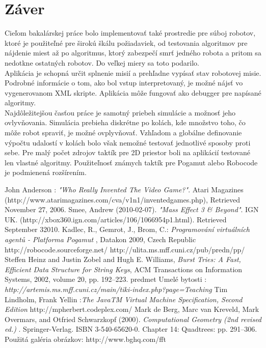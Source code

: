 \documentclass[12pt,notitlepage]{report}
\begin{document}
\chapter{Záver}
Cieľom bakalárskej práce bolo implementovať také prostredie pre súboj robotov, ktoré je použiteľné pre širokú škálu požiadaviek, od testovania algoritmov pre nájdenie miest až po algoritmus, ktorý zabezpečí smrť jedného robota a pritom sa nedotkne ostatných robotov. Do veľkej miery sa toto podarilo. \\
Aplikácia je schopná určit splnenie misií a prehľadne vypísať stav robotovej misie. Podrobné informácie o tom, ako bol vstup interpretovaný, je možné nájsť vo vygenerovanom XML skripte. Aplikácia môže fungovať ako debugger pre napísané algoritmy.\\
Najdôležitejšou časťou práce je samotný priebeh simulácie a možnosť jeho ovlyvňovania. Simulácia prebieha diskrétne po kolách, kde množstvo toho, čo môže robot spraviť, je možné ovplyvňovať. Vzhľadom a globálne definovanie výpočtu udalostí v kolách bolo však nemožné testovať jednotlivé sposoby proti sebe.  Pre malý počet zdrojov taktík pre 2D priestor boli na aplikácií testované len vlastné algoritmy. Použiteľnosť známych taktík pre Pogamut\cite{pogamut} alebo Robocode\cite{robocode} je podmienená rozšírením.\\

\newpage
{}
\begin{thebibliography}{99}
John Anderson : \emph{"Who Really Invented The Video Game?"}. Atari Magazines (http://www.atarimagazines.com/cva/v1n1/inventedgames.php),
Retrieved November 27, 2006.
Smee, Andrew (2010-02-07). \emph{"Mass Effect 3 \& Beyond"}. IGN UK. (http://xbox360.ign.com/articles/106/1066954p1.html). Retrieved September 32010.
 Kadlec, R., Gemrot, J., Brom, C.:\emph{ Programování virtuálních agentů - Platforma Pogamut }, Datakon 2009, Czech Republic
 http://robocode.sourceforge.net/
 http://ulita.ms.mff.cuni.cz/pub/predn/pp/
Steffen Heinz and Justin Zobel and Hugh E. Williams,
    \emph{Burst Tries: A Fast, Efficient Data Structure for String Keys},
    ACM Transactions on Information Systems, 2002,
    volume 20, pp. 192--223.
 predmet Umelé bytosti : \emph{http://artemis.ms.mff.cuni.cz/main/tiki-index.php?page=Teaching}
 Tim Lindholm, Frank Yellin :\emph{The JavaTM Virtual Machine Specification, Second Edition}
http://mpherbert.codeplex.com/
   Mark de Berg, Marc van Kreveld, Mark Overmars, and Otfried Schwarzkopf (2000). \emph{ Computational Geometry (2nd revised ed.) }. Springer-Verlag. ISBN 3-540-65620-0.  Chapter 14: Quadtrees: pp. 291–306.
 Použitá galéria obrázkov: http://www.bghq.com/fft 
\end{thebibliography}
\end{document}
